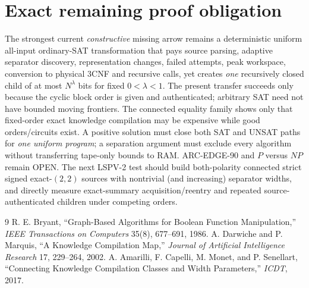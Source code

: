 \documentclass[11pt]{article}
\begin{document}
\section{Exact remaining proof obligation}
The strongest current \emph{constructive} missing arrow remains a deterministic uniform all-input ordinary-SAT transformation that pays source parsing, adaptive separator discovery, representation changes, failed attempts, peak workspace, conversion to physical 3CNF and recursive calls, yet creates \emph{one} recursively closed child of at most $N^\lambda$ bits for fixed $0<\lambda<1$. The present transfer succeeds only because the cyclic block order is given and authenticated; arbitrary SAT need not have bounded moving frontiers. The connected equality family shows only that fixed-order exact knowledge compilation may be expensive while good orders/circuits exist. A positive solution must close both SAT and UNSAT paths for \emph{one uniform program}; a separation argument must exclude every algorithm without transferring tape-only bounds to RAM. ARC-EDGE-90 and $P$ versus $NP$ remain OPEN. The next LSPV-2 test should build both-polarity connected strict signed exact-$(2,2)$ sources with nontrivial (and increasing) separator widths, and directly measure exact-summary acquisition/reentry and repeated source-authenticated children under competing orders.

\begin{thebibliography}{9}
 R. E. Bryant, ``Graph-Based Algorithms for Boolean Function Manipulation,'' \emph{IEEE Transactions on Computers} 35(8), 677--691, 1986.
 A. Darwiche and P. Marquis, ``A Knowledge Compilation Map,'' \emph{Journal of Artificial Intelligence Research} 17, 229--264, 2002.
 A. Amarilli, F. Capelli, M. Monet, and P. Senellart, ``Connecting Knowledge Compilation Classes and Width Parameters,'' \emph{ICDT}, 2017.
\end{thebibliography}
\end{document}
